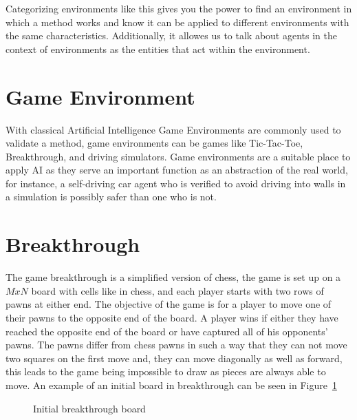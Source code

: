 Categorizing environments like this gives you the power to find an environment in which a method works and know it can be applied to different environments with the same characteristics. Additionally, it allowes us to talk about agents in the context of environments as the entities that act within the environment.

\section{Game Environment}

With classical Artificial Intelligence Game Environments are commonly used to validate a method, game environments can be games like Tic-Tac-Toe, Breakthrough, and driving simulators. Game environments are a suitable place to apply AI as they serve an important function as an abstraction of the real world, for instance, a self-driving car agent who is verified to avoid driving into walls in a simulation is possibly safer than one who is not.

\section{Breakthrough}

The game breakthrough is a simplified version of chess, the game is set up on a $MxN$ board with cells like in chess, and each player starts with two rows of pawns at either end. The objective of the game is for a player to move one of their pawns to the opposite end of the board. A player wins if either they have reached the opposite end of the board or have captured all of his opponents' pawns. The pawns differ from chess pawns in such a way that they can not move two squares on the first move and, they can move diagonally as well as forward, this leads to the game being impossible to draw as pieces are always able to move. An example of an initial board in breakthrough can be seen in Figure~\ref{fig:initbtboard}

\begin{figure}[]
  \centering


  \caption{Initial breakthrough board}
  \label{fig:initbtboard}
\end{figure}


